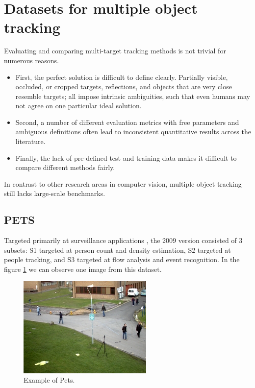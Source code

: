 \section{Datasets for multiple object tracking}

Evaluating and comparing multi-target tracking methods is not trivial for numerous reasons. 

\begin{itemize}

\item First, the perfect solution is difficult to define clearly. Partially visible, occluded, or cropped targets, reflections, and objects that are very close resemble targets; all impose intrinsic ambiguities, such that even humans may not agree on one particular ideal solution.

\item Second, a number of different evaluation metrics with free parameters and ambiguous definitions often lead to inconsistent quantitative results across the literature.

\item Finally, the lack of pre-defined test and training data makes it difficult to compare different methods fairly.

\end{itemize}


In contrast to other research areas in computer vision, multiple object tracking still lacks large-scale benchmarks.

\subsection{PETS}

Targeted primarily at surveillance applications \cite{pets}, the 2009 version consisted of 3 subsets: S1 targeted at person count and density estimation, S2 targeted at people tracking, and S3 targeted at flow analysis and event recognition. In the figure \ref{petsExample} we can observe one image from this dataset.

\begin{figure}[H]
\centering         
\includegraphics[width=0.5\linewidth]{datasetTracking/View_001.jpg}
\caption{Example of Pets.} \label{petsExample}
\end{figure}

